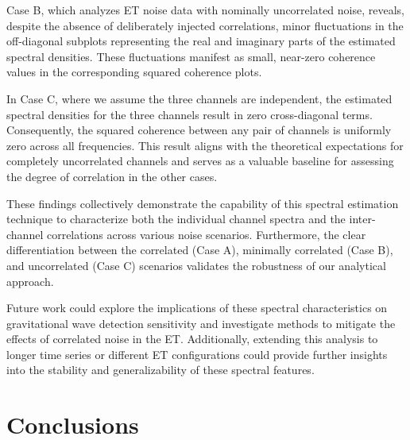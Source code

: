 \documentclass[%
 reprint,
 amsmath,amssymb,
 aps,
 nofootinbib,
]{revtex4-2}
\begin{document}
Case B, which analyzes ET noise data with nominally uncorrelated noise, reveals, despite the absence of deliberately injected correlations, minor fluctuations in the off-diagonal subplots representing the real and imaginary parts of the estimated spectral densities. 
These fluctuations manifest as small, near-zero coherence values in the corresponding squared coherence plots. 


In Case C, where we assume the three channels are independent, the estimated spectral densities for the three channels result in zero cross-diagonal terms. 
Consequently, the squared coherence between any pair of channels is uniformly zero across all frequencies. 
This result aligns with the theoretical expectations for completely uncorrelated channels and serves as a valuable baseline for assessing the degree of correlation in the other cases.

These findings collectively demonstrate the capability of this spectral estimation technique to characterize both the individual channel spectra and the inter-channel correlations across various noise scenarios. 
Furthermore, the clear differentiation between the correlated (Case A), minimally correlated (Case B), and uncorrelated (Case C) scenarios validates the robustness of our analytical approach.

Future work could explore the implications of these spectral characteristics on gravitational wave detection sensitivity and investigate methods to mitigate the effects of correlated noise in the ET. 
Additionally, extending this analysis to longer time series or different ET configurations could provide further insights into the stability and generalizability of these spectral features.







\section{Conclusions}
\label{sec:Discussion}
\end{document}
